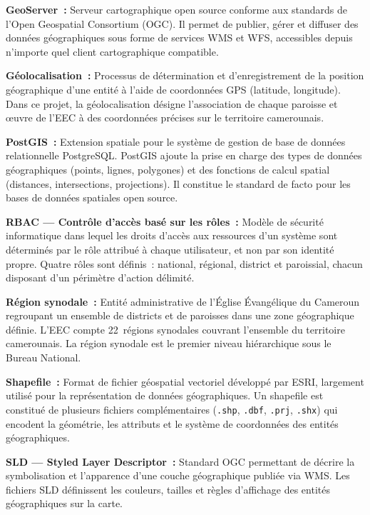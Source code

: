 \documentclass[12pt, a4paper]{report}
\begin{document}
\medskip
\noindent\textbf{GeoServer~:}
Serveur cartographique open source conforme aux standards de l'Open Geospatial
Consortium (OGC). Il permet de publier, gérer et diffuser des données
géographiques sous forme de services WMS et WFS, accessibles depuis n'importe
quel client cartographique compatible.

\medskip
\noindent\textbf{Géolocalisation~:}
Processus de détermination et d'enregistrement de la position géographique d'une
entité à l'aide de coordonnées GPS (latitude, longitude). Dans ce projet, la
géolocalisation désigne l'association de chaque paroisse et œuvre de l'EEC à des
coordonnées précises sur le territoire camerounais.

\medskip
\noindent\textbf{PostGIS~:}
Extension spatiale pour le système de gestion de base de données relationnelle
PostgreSQL. PostGIS ajoute la prise en charge des types de données géographiques
(points, lignes, polygones) et des fonctions de calcul spatial (distances,
intersections, projections). Il constitue le standard de facto pour les bases de
données spatiales open source.

\medskip
\noindent\textbf{RBAC --- Contrôle d'accès basé sur les rôles~:}
Modèle de sécurité informatique dans lequel les droits d'accès aux ressources
d'un système sont déterminés par le rôle attribué à chaque utilisateur, et non
par son identité propre. Quatre rôles sont définis~: national, régional, district
et paroissial, chacun disposant d'un périmètre d'action délimité.

\medskip
\noindent\textbf{Région synodale~:}
Entité administrative de l'Église Évangélique du Cameroun regroupant un ensemble
de districts et de paroisses dans une zone géographique définie. L'EEC compte
22~régions synodales couvrant l'ensemble du territoire camerounais. La région
synodale est le premier niveau hiérarchique sous le Bureau National.

\medskip
\noindent\textbf{Shapefile~:}
Format de fichier géospatial vectoriel développé par ESRI, largement utilisé pour
la représentation de données géographiques. Un shapefile est constitué de plusieurs
fichiers complémentaires (\texttt{.shp}, \texttt{.dbf}, \texttt{.prj},
\texttt{.shx}) qui encodent la géométrie, les attributs et le système de
coordonnées des entités géographiques.

\medskip
\noindent\textbf{SLD --- Styled Layer Descriptor~:}
Standard OGC permettant de décrire la symbolisation et l'apparence d'une couche
géographique publiée via WMS. Les fichiers SLD définissent les couleurs, tailles
et règles d'affichage des entités géographiques sur la carte.
\end{document}

